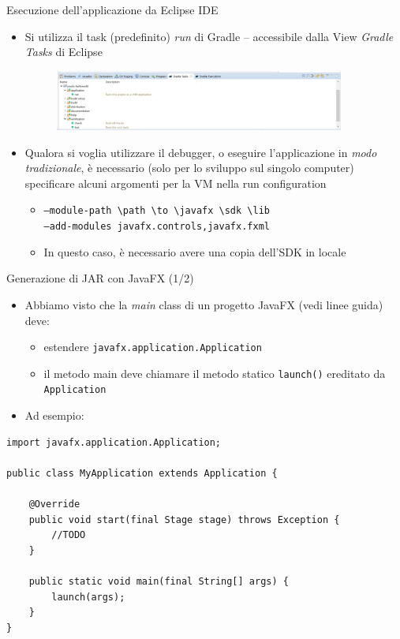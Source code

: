 \documentclass[presentation]{beamer}
\begin{document}
\begin{frame}{Esecuzione dell'applicazione da Eclipse IDE}
\begin{itemize}\itemsep20pt
\item Si utilizza il task (predefinito) \emph{run} di Gradle -- accessibile dalla View \emph{Gradle Tasks} di Eclipse
\begin{figure}
\includegraphics[width=0.9\textwidth]{img/gradle-tasks-view.png}
\end{figure}
\end{itemize}
\begin{itemize}
\item Qualora si voglia utilizzare il debugger, o eseguire l'applicazione in \emph{modo tradizionale}, è necessario (solo per lo sviluppo sul singolo computer) specificare alcuni argomenti per la VM nella run configuration
\begin{itemize}
\item \texttt{--module-path \textbackslash path \textbackslash to \textbackslash javafx \textbackslash sdk \textbackslash lib \\--add-modules javafx.controls,javafx.fxml}
\item In questo caso, è necessario avere una copia dell'SDK in locale
\end{itemize}
\end{itemize}
\end{frame}

\begin{frame}[fragile]{Generazione di JAR con JavaFX (1/2)}
\begin{itemize}
\item Abbiamo visto che la \emph{main} class di un progetto JavaFX (vedi linee guida) deve:
\begin{itemize}
\item estendere \texttt{javafx.application.Application} 
\item il metodo main deve chiamare il metodo statico \texttt{launch()} ereditato da \texttt{Application}
\end{itemize}
\item Ad esempio: 
\end{itemize}

\begin{footnotesize}
\begin{lstlisting}
import javafx.application.Application;

public class MyApplication extends Application {

	@Override
	public void start(final Stage stage) throws Exception {
		//TODO
	}
	
	public static void main(final String[] args) {
		launch(args);
	}
}
\end{lstlisting}
\end{footnotesize}
\end{frame}
\end{document}
